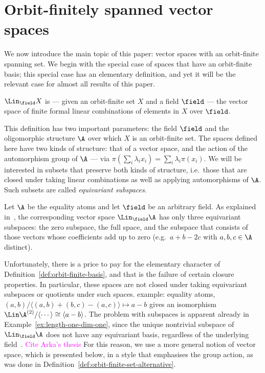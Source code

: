 \section{Orbit-finitely spanned vector spaces}\label{sec:spaces}
We now introduce the main topic of this paper: vector spaces with an orbit-finite spanning set. 
We begin with the special case of spaces that have an orbit-finite basis; 
this special case has an elementary definition, and yet it will be the relevant case for almost all results of this paper. 

\begin{definition}\label{def:orbit-finite-basis}
    $\Lin_\field X$ is --- given an orbit-finite set $X$ and a field $\field$ --- the vector space of finite formal linear combinations of elements in $X$ over $\field$.
\end{definition}

This definition has two important parameters: the field $\field$ and the oligomorphic structure $\A$ over which $X$ is an orbit-finite set.
The spaces defined here have two kinds of structure: that of a vector space, and the action of the automorphism group of $\A$
--- via $\pi(\sum_i \lambda_i x_i) = \sum_i \lambda_i \pi(x_i)$. 
We will be interested in subsets that preserve both kinds of structure, 
i.e.~those that are closed under taking linear combinations as well as applying automorphisms of $\A$. 
Such subsets are called \emph{equivariant subspaces}. 


\begin{myexample}\label{ex:length-one-dim-one}
    Let $\A$ be the equality atoms and let $\field$ be an arbitrary field. 
    As explained in~\cite[Ex.~4.2]{BFKM24}, the corresponding vector space $\Lin_\field \A$ has only three equivariant subspaces: 
    the zero subspace, the full space, and the subspace that consists of those vectors whose coefficients add up to zero 
    (e.g.~$a + b - 2 c$ with $a, b, c \in \A$ distinct). 
\end{myexample}

 Unfortunately, there is a price to pay for the elementary character of Definition~\ref{def:orbit-finite-basis}, 
 and that is the failure of certain closure  properties. 
 In particular, these spaces are not closed under taking equivariant subspaces or quotients under such spaces. 
 \color{magenta}example: equality atoms, $(a, b) / \langle (a, b) + (b, c) - (a, c) \rangle \mapsto a - b$ gives an isomorphism $\Lin \A^{(2)} / \langle \cdots \rangle \cong \langle a - b \rangle$\color{black}. 
 The problem with subspaces is apparent already in Example~\ref{ex:length-one-dim-one}, since the unique nontrivial subspace of $\Lin_\field \A$ does not have any equivariant basis, regardless of the underlying field~\cite[Ex.~6.1]{BFKM24}. 
 \textcolor{magenta}{Cite Arka's thesis}
 For this reason, we use a more general notion of vector space, which is presented below, in a style that emphasises the group action, as was done in Definition~\ref{def:orbit-finite-set-alternative}.


